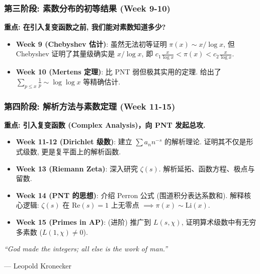 \begin{frame}
\frametitle{第三阶段: 素数分布的初等结果 (Week 9-10)}
\textbf{重点: 在引入复变函数之前, 我们能对素数知道多少?}
\begin{itemize}
\item \textbf{Week 9 (Chebyshev 估计)}: 虽然无法初等证明 $\pi(x) \sim x/\log x$, 但 Chebyshev 证明了其量级确实是 $x/\log x$, 即 $c_1 \frac{x}{\log x} < \pi(x) < c_2 \frac{x}{\log x}$.
\item \textbf{Week 10 (Mertens 定理)}: 比 PNT 弱但极其实用的定理. 给出了 $\sum_{p \le x} \frac{1}{p} \sim \log \log x$ 等精确估计.
\end{itemize}
\end{frame}

\begin{frame}
\frametitle{第四阶段: 解析方法与素数定理 (Week 11-15)}
\textbf{重点: 引入复变函数 (Complex Analysis)，向 PNT 发起总攻.}
\begin{itemize}
    \item \textbf{Week 11-12 (Dirichlet 级数)}: 建立 $\sum a_n n^{-s}$ 的解析理论. 证明其不仅是形式级数, 更是复平面上的解析函数.
    \item \textbf{Week 13 (Riemann Zeta)}: 深入研究 $\zeta(s)$. 解析延拓、函数方程、极点与留数.
    \item \textbf{Week 14 (PNT 的思想)}: 介绍 Perron 公式 (围道积分表达系数和). 解释核心逻辑: $\zeta(s)$ 在 $\mathrm{Re}(s)=1$ 上无零点 $\implies \pi(x) \sim \mathrm{Li}(x)$.
    \item \textbf{Week 15 (Primes in AP)}: (进阶) 推广到 $L(s, \chi)$, 证明算术级数中有无穷多素数 ($L(1, \chi) \neq 0$).
\end{itemize}
\end{frame}


\begin{frame}
\centering
\vspace{1cm}
{\Large \textit{``God made the integers; all else is the work of man.''}}

\vspace{0.5cm}
\hfill --- Leopold Kronecker

\end{frame}



